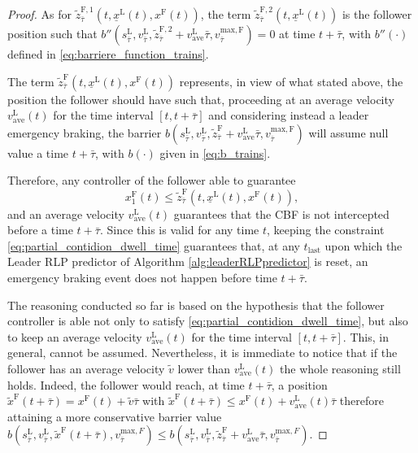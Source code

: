 \documentclass[letterpaper, 10 pt, conference]{ieeeconf}
\theoremstyle{definition}
\theoremstyle{nopoint}
\begin{document}
\begin{proof}
As for $\tilde{z}^{\mathrm{F},1}_{\bar{\tau}} (t,\underline{x}^\mathrm{L}(t),x^\mathrm{F}(t))$, the term $\tilde{z}^{\mathrm{F},2}_{\bar{\tau}} (t,\underline{x}^\mathrm{L}(t))$ is the follower position such that $b''(s_{\bar{\tau}}^\mathrm{L},v_{\bar{\tau}}^\mathrm{L},\tilde{z}^{\mathrm{F},2}_{\bar{\tau}}+v_{\mathrm{ave}}^\mathrm{L}\bar{\tau},v_{\bar{\tau}}^{\mathrm{max}, \mathrm{F}})=0$ at time $t+\bar{\tau}$, with $b''(\cdot)$ defined in \eqref{eq:barriere_function_trains}.

The term $\tilde{z}^{\mathrm{F}}_{\bar{\tau}} (t,\underline{x}^\mathrm{L}(t),x^\mathrm{F}(t))$ represents, in view of what stated above, the position the follower should have such that, proceeding at an average velocity $v_{\mathrm{ave}}^\mathrm{L}(t)$ for the time interval $[t, t+\bar{\tau}]$ and considering instead a leader emergency braking, the barrier $b(s_{\bar{\tau}}^\mathrm{L},v_{\bar{\tau}}^\mathrm{L},\tilde{z}^{\mathrm{F}}_{\bar{\tau}}+v_{\mathrm{ave}}^\mathrm{L}\bar{\tau},v_{\bar{\tau}}^{\mathrm{max}, \mathrm{F}})$ will assume null value a time $t+\bar{\tau}$, with $b(\cdot)$ given in \eqref{eq:b_trains}.

Therefore, any controller of the follower able to guarantee
\begin{equation}\label{eq:partial_contidion_dwell_time}
x_1^\mathrm{F}(t)\leq \tilde{z}^{\mathrm{F}}_{\bar{\tau}} (t,\underline{x}^\mathrm{L}(t),x^\mathrm{F}(t)), 
\end{equation}
and an average velocity $v_{\mathrm{ave}}^\mathrm{L}(t)$ guarantees that the CBF is not intercepted before a time $t+\bar{\tau}$. Since this is valid for any time $t$, keeping the constraint \eqref{eq:partial_contidion_dwell_time} guarantees that, at any $t_{\mathrm{last}}$ upon which the Leader RLP predictor of Algorithm \ref{alg:leaderRLPpredictor} is reset, an emergency braking event does not happen before time $t+\bar{\tau}$. 

The reasoning conducted so far is based on the hypothesis that the follower controller is able not only to satisfy \eqref{eq:partial_contidion_dwell_time}, but also to keep an average velocity $v_{\mathrm{ave}}^\mathrm{L}(t)$ for the time interval $[t, t+\bar{\tau}]$. This, in general, cannot be assumed. Nevertheless, it is immediate to notice that if the follower has an average velocity $\tilde{v}$ lower than $v_{\mathrm{ave}}^\mathrm{L}(t)$  the whole reasoning still holds. Indeed, the follower would reach, at time $t+\bar{\tau}$, a position $\tilde{x}^\mathrm{F}(t+\bar{\tau})=x^{\mathrm{F}}(t)+\tilde{v}\bar{\tau}$ with $\tilde{x}^\mathrm{F}(t+\bar{\tau})\leq x^{\mathrm{F}}(t)+v_{\mathrm{ave}}^\mathrm{L}(t)\bar{\tau} $ therefore attaining a more conservative barrier value
$b(s_{\bar{\tau}}^\mathrm{L},v_{\bar{\tau}}^\mathrm{L},\tilde{x}^\mathrm{F}(t+\bar{\tau}),v_{\bar{\tau}}^{\mathrm{max}, F})\leq b(s_{\bar{\tau}}^\mathrm{L},v_{\bar{\tau}}^\mathrm{L},\tilde{z}^{\mathrm{F}}_{\bar{\tau}}+v_{\mathrm{ave}}^\mathrm{L}\bar{\tau} ,v_{\bar{\tau}}^{\mathrm{max}, F})$.


\end{proof}
\end{document}
